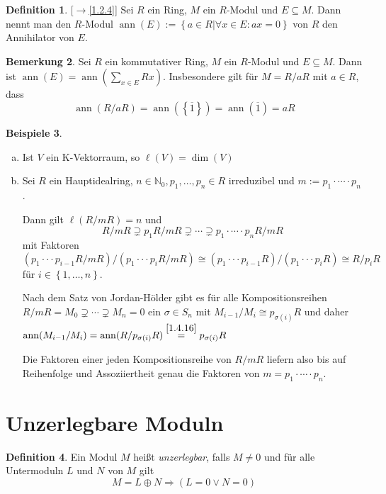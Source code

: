 \documentclass[
twoside=semi,
fontsize=12,
DIV=12, 
cleardoublepage=current,
leqno,
headings=optiontoheadandtoc, 
toc=idx
]{scrbook}
\newcommand{\N}{\mathbb{N}}
\newcommand{\brac}[1]{\left( #1 \right)}
\newcommand{\set}[1]{\left\{ #1 \right\}}
\DeclareMathOperator{\ann}{ann}
\theoremstyle{definition}
\newtheorem{definition}{Definition}[section]
\newtheorem{bemerkung}[definition]{Bemerkung}
\newtheorem{beispiele}[definition]{Beispiele}
\begin{document}
	\begin{definition}\label{1.4.15}
		[$\rightarrow$\ref{1.2.4}]\newline
		Sei $R$ ein Ring, $M$ ein $R$-Modul und $E\subseteq M$. Dann nennt man den $R$-Modul $\ann(E) := \set{a \in R|\forall x \in E: ax = 0}$ von $R$ den Annihilator von $E$.
	\end{definition}

	\begin{bemerkung}\label{1.4.16}
		Sei $R$ ein kommutativer Ring, $M$ ein $R$-Modul und $E\subseteq M$. Dann ist $\ann(E)=\ann\brac{\sum_{x\in E} Rx}$. Insbesondere gilt f\"ur $M=R/aR$ mit $a \in R$, dass
			\[\ann(R/aR) = \ann(\set{\overline{1}}) = \ann(\overline{1}) = aR\]
	\end{bemerkung}

	\begin{beispiele}\label{1.4.17}
		\begin{enumerate}[(a)]
			\item Ist $V$ ein K-Vektorraum, so $\ell(V) = \dim(V)$
			\item Sei $R$ ein Hauptidealring, $n\in\N_0, p_1, \dots, p_n \in R$ irreduzibel und $m:= p_1 \cdot \cdots \cdot p_n$.
			
			Dann gilt $\ell(R/mR) = n$ und 
				\[R/mR \supsetneq p_1R/mR \supsetneq \cdots \supsetneq p_1\cdot\cdots\cdot p_nR/mR\]
			mit Faktoren $(p_1\cdot \cdot \cdot p_{i-1}R/mR)/(p_1\cdot \cdot \cdot p_iR/mR) \cong (p_1\cdot \cdot \cdot p_{i-1}R)/(p_1\cdot \cdot \cdot p_iR) \cong R/p_iR$
			f\"ur $i \in \set{1,\dots,n}$.
			
			\noindent Nach dem Satz von Jordan-H\"older gibt es f\"ur alle Kompositionsreihen $R/mR = M_0 \supsetneq \cdots \supsetneq M_n = 0$ ein $\sigma \in S_n$ mit $M_{i-1}/M_i \cong p_{\sigma(i)}R$ und daher $\ann(M_{i-1}/M_i) = \ann(R/p_{\sigma(i)}R) \overset{\ref{1.4.16}}{=}p_{\sigma(i)}R$
			
			Die Faktoren einer jeden Kompositionsreihe von $R/mR$ liefern also bis auf Reihenfolge und Assoziiertheit genau die Faktoren von $m = p_1 \cdot \cdots \cdot p_n$.
  		\end{enumerate}
	\end{beispiele}

	\newpage
	\section{Unzerlegbare Moduln}
	\begin{definition}\label{1.5.1}
		Ein Modul $M$ hei\ss t \emph{unzerlegbar}, falls $M \neq 0$ und f\"ur alle Untermoduln $L$ und $N$ von $M$ gilt 
			\[M = L\oplus N \Rightarrow (L = 0 \lor N = 0)\]
	\end{definition}
\end{document}
